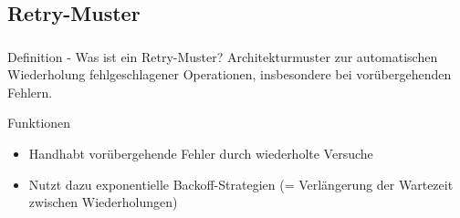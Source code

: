 

\subsection{\textbf{Retry-Muster}}
\begin{frame}
    \frametitle{\insertsection}
    \framesubtitle{\insertsubsection}
    \begin{block}{Definition - Was ist ein Retry-Muster?}
        Architekturmuster zur automatischen Wiederholung fehlgeschlagener Operationen, insbesondere bei vorübergehenden Fehlern.
    \end{block}
    \begin{block}{Funktionen}
        \begin{itemize}
            \item Handhabt vorübergehende Fehler durch wiederholte Versuche
            \item Nutzt dazu exponentielle Backoff-Strategien (= Verlängerung der Wartezeit zwischen Wiederholungen)
        \end{itemize}
    \end{block}
\end{frame}

